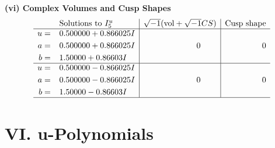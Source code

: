 \documentclass[1p]{elsarticle_modified}
\theoremstyle{definition}
\newcommand{\I}{\sqrt{-1}}
\begin{document}
\newpage\flushleft \textbf{(vi) Complex Volumes and Cusp Shapes}
$$\begin{array}{c|c|c}  
\text{Solutions to }I^u_{5}& \I (\text{vol} + \sqrt{-1}CS) & \text{Cusp shape}\\
 \hline 
\begin{aligned}
u &= \phantom{-}0.500000 + 0.866025 I \\
a &= \phantom{-}0.500000 + 0.866025 I \\
b &= \phantom{-}1.50000 + 0.86603 I\end{aligned}
 & \phantom{-0.000000 } 0 & \phantom{-0.000000 } 0 \\ \hline\begin{aligned}
u &= \phantom{-}0.500000 - 0.866025 I \\
a &= \phantom{-}0.500000 - 0.866025 I \\
b &= \phantom{-}1.50000 - 0.86603 I\end{aligned}
 & \phantom{-0.000000 } 0 & \phantom{-0.000000 } 0\\
 \hline 
 \end{array}$$\newpage
\newpage\renewcommand{\arraystretch}{1}
\centering \section*{ VI. u-Polynomials}
\end{document}
